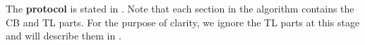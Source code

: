 	The \textbf{{\proto} protocol} is stated in .
	Note that each section in the algorithm contains the CB and TL parts.
	For the purpose of clarity, we ignore the TL parts at this stage and will describe them in .
		
